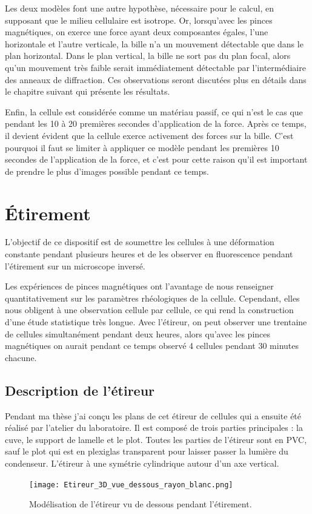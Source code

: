 Les deux modèles font une autre hypothèse, nécessaire pour le calcul, en supposant que le milieu cellulaire est isotrope.  
	Or, lorsqu'avec les pinces magnétiques, on exerce une force ayant deux composantes égales, l'une horizontale et l'autre verticale, la bille n'a un mouvement détectable que dans le plan horizontal. 
	Dans le plan vertical, la bille ne sort pas du plan focal, alors qu'un mouvement très faible serait immédiatement détectable par l'intermédiaire des anneaux de diffraction. Ces observations seront discutées plus en détails dans le chapitre suivant qui présente les résultats. 

	Enfin, la cellule est considérée comme un matériau passif, ce qui n'est le cas que pendant les 10 à 20 premières secondes d'application de la force. 
	Après ce temps, il devient évident que la cellule exerce activement des forces sur la bille. 
	C'est pourquoi il faut se limiter à appliquer ce modèle pendant les premières 10 secondes de l'application de la force, et c'est pour cette raison qu'il est important de prendre le plus d'images possible pendant ce temps. 
	
\section{\'Etirement}
	L'objectif de ce dispositif est de soumettre les cellules à une déformation constante pendant plusieurs heures et de les observer en fluorescence pendant l'étirement sur un microscope inversé. 
	
	Les expériences de pinces magnétiques ont l'avantage de nous renseigner quantitativement sur les paramètres rhéologiques de la cellule. Cependant, elles nous obligent à une observation cellule par cellule, ce qui rend la construction d'une étude statistique très longue. Avec l'étireur, on peut observer une trentaine de cellules simultanément pendant deux heures, alors qu'avec les pinces magnétiques on aurait pendant ce temps observé 4 cellules pendant 30 minutes chacune.
	
	\subsection{Description de l'étireur}
	Pendant ma thèse j'ai conçu les plans de cet étireur de cellules qui a ensuite été réalisé par l'atelier du laboratoire. Il est composé de trois parties principales : la cuve, le support de lamelle et le plot. Toutes les parties de l'étireur sont en PVC, sauf le plot qui est en plexiglas transparent pour laisser passer la lumière du condenseur. L'étireur à une symétrie cylindrique autour d'un axe vertical. 
	\begin{figure}
	\texttt{[image: Etireur\_3D\_vue\_dessous\_rayon\_blanc.png]}
	\caption{Modélisation de l'étireur vu de dessous pendant l'étirement.}
	\end{figure}

